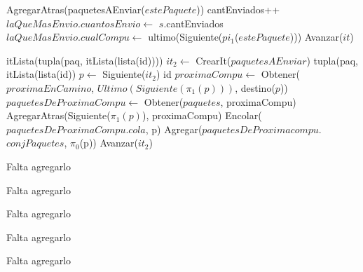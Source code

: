 \begin{Algoritmos}
\begin{algorithm}
\begin{algorithmic}[1]
		\State AgregarAtras(paquetesAEnviar($estePaquete$))
		\State cantEnviados++
		   \State $laQueMasEnvio.cuantosEnvio \gets$ $s$.cantEnviados
		   \State $laQueMasEnvio.cualCompu \gets$ ultimo(Siguiente($pi_1$($estePaquete$)))
		\EndIf
	\EndIf
	\State Avanzar($it$)
  \EndWhile 
   
  \State itLista(tupla(paq, itLista(lista(id)))) $it_2 \gets$ CrearIt($paquetesAEnviar$)
      \State tupla(paq, itLista(lista(id)) $p \gets$ Siguiente($it_2$)
      \State id $proximaCompu \gets$ Obtener($proximaEnCamino$, $Ultimo(Siguiente(\pi_1(p)))$, destino($p$))
      \State $paquetesDeProximaCompu \gets$ Obtener($paquetes$, proximaCompu)
      \State AgregarAtras(Siguiente($\pi_1(p)$), proximaCompu)
      \State Encolar($paquetesDeProximaCompu$.$cola$, p)
      \State Agregar($paquetesDeProximacompu$.$conjPaquetes$, $\pi_0$(p))
      \State Avanzar($it_2$)
  \EndWhile
 
 \EndProcedure
\end{algorithmic}

\begin{algorithmic}[1]
 \State Falta agregarlo
 \EndProcedure
\end{algorithmic}


\begin{algorithmic}[1]
   \State Falta agregarlo
  \EndProcedure
\end{algorithmic}

\begin{algorithmic}[1]
   \State Falta agregarlo
  \EndProcedure
\end{algorithmic}

\begin{algorithmic}[1]
   \State Falta agregarlo
  \EndProcedure
\end{algorithmic}

\begin{algorithmic}[1]
   \State Falta agregarlo
  \EndProcedure
\end{algorithmic}


\end{algorithm}
\end{Algoritmos}
